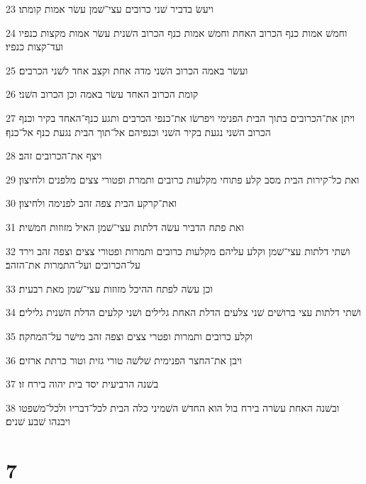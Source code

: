 \par 23 ויעשׂ בדביר שׁני כרובים עצי־שׁמן עשׂר אמות קומתו׃
\par 24 וחמשׁ אמות כנף הכרוב האחת וחמשׁ אמות כנף הכרוב השׁנית עשׂר אמות מקצות כנפיו ועד־קצות כנפיו׃
\par 25 ועשׂר באמה הכרוב השׁני מדה אחת וקצב אחד לשׁני הכרבים׃
\par 26 קומת הכרוב האחד עשׂר באמה וכן הכרוב השׁני׃
\par 27 ויתן את־הכרובים בתוך הבית הפנימי ויפרשׂו את־כנפי הכרבים ותגע כנף־האחד בקיר וכנף הכרוב השׁני נגעת בקיר השׁני וכנפיהם אל־תוך הבית נגעת כנף אל־כנף׃
\par 28 ויצף את־הכרובים זהב׃
\par 29 ואת כל־קירות הבית מסב קלע פתוחי מקלעות כרובים ותמרת ופטורי צצים מלפנים ולחיצון׃
\par 30 ואת־קרקע הבית צפה זהב לפנימה ולחיצון׃
\par 31 ואת פתח הדביר עשׂה דלתות עצי־שׁמן האיל מזוזות חמשׁית׃
\par 32 ושׁתי דלתות עצי־שׁמן וקלע עליהם מקלעות כרובים ותמרות ופטורי צצים וצפה זהב וירד על־הכרובים ועל־התמרות את־הזהב׃
\par 33 וכן עשׂה לפתח ההיכל מזוזות עצי־שׁמן מאת רבעית׃
\par 34 ושׁתי דלתות עצי ברושׁים שׁני צלעים הדלת האחת גלילים ושׁני קלעים הדלת השׁנית גלילים׃
\par 35 וקלע כרובים ותמרות ופטרי צצים וצפה זהב מישׁר על־המחקה׃
\par 36 ויבן את־החצר הפנימית שׁלשׁה טורי גזית וטור כרתת ארזים׃
\par 37 בשׁנה הרביעית יסד בית יהוה בירח זו׃
\par 38 ובשׁנה האחת עשׂרה בירח בול הוא החדשׁ השׁמיני כלה הבית לכל־דבריו ולכל־משׁפטו ויבנהו שׁבע שׁנים׃

\chapter{7}

